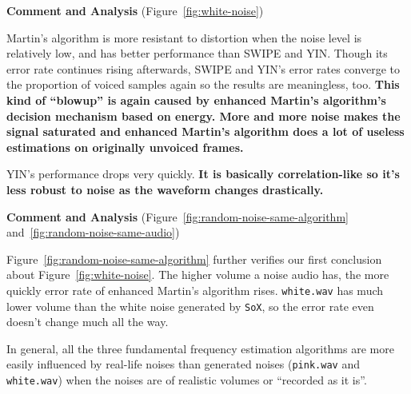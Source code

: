 \documentclass[11pt,a4paper,titlepage]{article}
\begin{document}
\begin{mdframed}
\textbf{Comment and Analysis} (Figure~\ref{fig:white-noise})

\bigskip

Martin's algorithm is more resistant to distortion when the noise level is relatively low, and has better performance than SWIPE and YIN\@.
Though its error rate continues rising afterwards, SWIPE and YIN's error rates converge to the proportion of voiced samples again so the results are meaningless, too.
\textbf{This kind of \enquote{blowup} is again caused by enhanced Martin's algorithm's decision mechanism based on energy.
More and more noise makes the signal saturated and enhanced Martin's algorithm does a lot of useless estimations on originally unvoiced frames.}

\bigskip

YIN's performance drops very quickly.
\textbf{It is basically correlation-like so it's less robust to noise as the waveform changes drastically.}
\end{mdframed}

\begin{mdframed}
\textbf{Comment and Analysis} (Figure~\ref{fig:random-noise-same-algorithm} and~\ref{fig:random-noise-same-audio})

\bigskip

Figure~\ref{fig:random-noise-same-algorithm} further verifies our first conclusion about Figure~\ref{fig:white-noise}.
The higher volume a noise audio has, the more quickly error rate of enhanced Martin's algorithm rises.
\texttt{white.wav} has much lower volume than the white noise generated by \texttt{SoX}, so the error rate even doesn't change much all the way.

\bigskip

In general, all the three fundamental frequency estimation algorithms are more easily influenced by real-life noises than generated noises (\texttt{pink.wav} and \texttt{white.wav}) when the noises are of realistic volumes or \enquote{recorded as it is}.

\end{mdframed}
\end{document}
